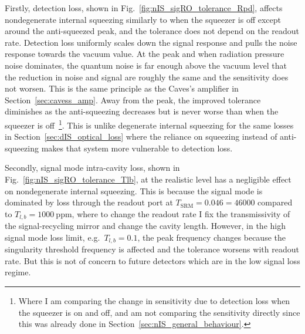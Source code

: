 Firstly, detection loss, shown in Fig.~\ref{fig:nIS_sigRO_tolerance_Rpd}, affects nondegenerate internal squeezing similarly to when the squeezer is off except around the anti-squeezed peak, and the tolerance does not depend on the readout rate. Detection loss uniformly scales down the signal response and pulls the noise response towards the vacuum value. At the peak and when radiation pressure noise dominates, the quantum noise is far enough above the vacuum level that the reduction in noise and signal are roughly the same and the sensitivity does not worsen. This is the same principle as the Caves's amplifier in Section~\ref{sec:cavess_amp}. Away from the peak, the improved tolerance diminishes as the anti-squeezing decreases but is never worse than when the squeezer is off~\footnote{Where I am comparing the change in sensitivity due to detection loss when the squeezer is on and off, and am not comparing the sensitivity directly since this was already done in Section~\ref{sec:nIS_general_behaviour}.}. This is unlike degenerate internal squeezing for the same losses in Section~\ref{sec:dIS_optical_loss} where the reliance on squeezing instead of anti-squeezing makes that system more vulnerable to detection loss.

Secondly, signal mode intra-cavity loss, shown in Fig.~\ref{fig:nIS_sigRO_tolerance_Tlb}, at the realistic level has a negligible  effect on nondegenerate internal squeezing. This is because the signal mode is dominated by loss through the readout port at $T_\text{SRM}=0.046=46000$  compared to $T_{l,b}=1000~\text{ppm}$, where to change the readout rate I fix the transmissivity of the signal-recycling mirror and change the cavity length.  However, in the high signal mode loss limit, e.g.\ $T_{l,b}=0.1$, the peak frequency changes because the singularity threshold frequency is affected and the tolerance worsens with readout rate.   But this is not of concern to future detectors which are in the low signal loss regime.


